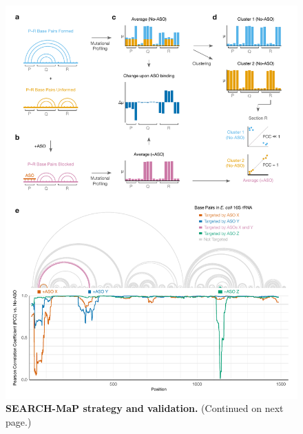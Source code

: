 \documentclass[main.tex]{subfiles}
\begin{document}
\begin{figure}[H]
	\includegraphics[width=\textwidth]{../MainFigures/search-map/search-map.pdf}
	\caption{\textbf{SEARCH-MaP strategy and validation.} (Continued on next page.)}
	\label{search-map}
\end{figure}
\addtocounter{figure}{-1}
\end{document}

